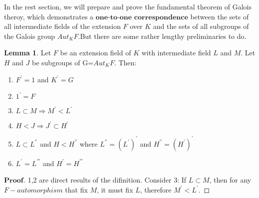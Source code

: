 \documentclass[a4paper, 11pt]{article}
\theoremstyle{remark}
\newenvironment{myprf}
{\renewcommand\qedsymbol{$ $}\begin{proof}[$\mathbf{Proof}$]}
  {\end{proof}}
\theoremstyle{definition}
\newtheorem{lemma}[theorem]{Lemma}
\begin{document}
    \vspace{0.5cm}
    In the rest section, we will prepare and prove the fundamental theorem of Galois
    theroy, which demonstrates a $\textbf{one-to-one correspondence}$ between the sets of all intermediate
    fields of the extension $F$ over $K$ and the sets of all subgroups of the Galois group
    $Aut_KF$.But there are some rather lengthy preliminaries to do.
    \vspace{0.5cm}

    \begin{lemma}
        Let $F$ be an extension field of $K$ with intermediate field $L$ and $M$. Let $H$ and $J$ be
        subgroups of G=$Aut_KF$. Then:
        \begin{enumerate}
                \item $F^{'}=1$ and $K^{'}=G$ 
                \item $1^{'}=F $
                \item $L\subset M \Rightarrow M^{'}<L^{'}$
                \item $H<J\Rightarrow J^{'}\subset H^{'}$
                \item $L\subset L^{''}$ and $H < H^{''}$ where $L^{''}=(L^{'})^{'}$ and $H^{''}=(H^{'})^{'} $
                \item $L^{'}=L^{'''}$ and $H^{'}=H^{'''}$
        \end{enumerate}                    
    \end{lemma}
    \vspace{0.3cm}
    \begin{myprf}
        1,2 are direct results of the difinition. Consider 3: If $L\subset M$, then 
        for any $F-automorphism$ that fix $M$, it must fix $L$, therefore $M^{'}< L^{'}$.
    \end{myprf}
\end{document}
